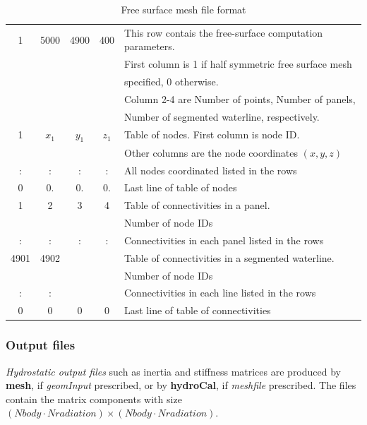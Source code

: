 \documentclass[12pt,a4paper,titlepage]{article}
\begin{document}
\begin{table}[ht]
\begin{center}
\caption{Free surface mesh file format}\label{tab:FSmeshfile}
\begin{tabular}{ccccl}
\hline
1 & 5000&4900&400& This row contais the free-surface computation parameters.\\
\ &\ &\ &\ &  First column is 1 if half symmetric free surface mesh\\
\ &\ &\ &\ & specified, 0 otherwise.\\
\ &\ &\ &\ &  Column 2-4 are Number of points, Number of panels,\\
\ &\ &\ &\ &  Number of segmented waterline, respectively.\\
\hline
1 & $x_1$& $y_1$ &$z_1$ & Table of nodes. First column is node ID.\\
\ &\ &\ &\ &Other columns are the node coordinates $(x,y,z)$\\
\hline
: & :&  :& : & All nodes coordinated listed in the rows\\
\hline
0 & 0.&  0.& 0.& Last line of table of nodes\\
\hline
1 & 2& 3 & 4 & Table of connectivities in a panel.\\
\ &\ &\ &\ & Number of node IDs\\
\hline
: & :&  :& : & Connectivities in each panel listed in the rows\\
\hline
4901 & 4902& \ & \ & Table of connectivities in a segmented waterline.\\
\ &\ &\ &\ & Number of node IDs\\
\hline
: & :&  & & Connectivities in each line listed in the rows\\
\hline
0 & 0&  0& 0& Last line of table of connectivities\\
\hline
\end{tabular}
\end{center}
\end{table}


\subsubsection{Output files}
\textit{Hydrostatic output files} such as inertia and stiffness matrices are produced by \textbf{mesh}, if \textit{geomInput} prescribed, or by \textbf{hydroCal}, if \textit{meshfile} prescribed. The files contain the matrix components with size $(Nbody\cdot Nradiation)\times (Nbody\cdot Nradiation)$.
\end{document}
